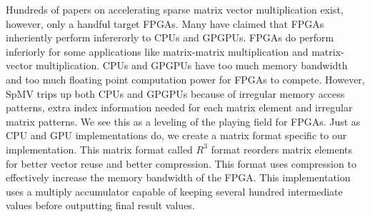 Hundreds of papers on accelerating sparse matrix vector multiplication exist, however, only a handful target FPGAs. Many have claimed that FPGAs inheriently perform infererorly to CPUs and GPGPUs. FPGAs do perform inferiorly for some applications like matrix-matrix multiplication and matrix-vector multiplication. CPUs and GPGPUs have too much memory bandwidth and too much floating point computation power for FPGAs to compete. However, SpMV trips up both CPUs and GPGPUs because of irregular memory access patterns, extra index information needed for each matrix element and irregular matrix patterns. We see this as a leveling of the playing field for FPGAs. Just as CPU and GPU implementations do, we create a matrix format specific to our implementation. This matrix format called $R^3$  format reorders matrix elements for better vector reuse and better compression. This format uses compression to effectively increase the memory bandwidth of the FPGA. This implementation uses a multiply accumulator capable of keeping several hundred intermediate values before outputting final result values.
